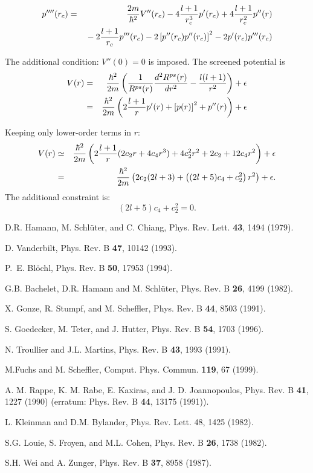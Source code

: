 \documentclass[12pt]{article}
\begin{document}
\begin{eqnarray}
p''''(r_c) & = & {2m\over\hbar^2}V''(r_c) - 4 {l+1\over r^3_c}p'(r_c)
                 + 4{l+1\over r^2_c}p''(r) \nonumber \\ & & \mbox{} 
            - 2{l+1\over r_c}p'''(r_c)
           - 2 \left[p''(r_c)p''(r_c)\right]^2 -2 p'(r_c)p'''(r_c)
\end{eqnarray}

The additional condition: $V''(0)=0$ is imposed. 
The screened potential is
\begin{eqnarray}
V(r)&=&{\hbar^2\over2m}\left({1\over R^{ps}(r)}{d^2R^{ps}(r)\over dr^2} 
     - {l(l+1)\over r^2}\right)+\epsilon \\
    &=&{\hbar^2\over2m}\left( 2{l+1\over r} p'(r)+\left[p(r)\right]^2+p''(r)
       \right)+\epsilon
\end{eqnarray}

Keeping only lower-order terms in $r$:
\begin{eqnarray}
V(r) &\simeq&{\hbar^2\over2m}\left( 2{l+1\over r} (2c_2r + 4c_4r^3) 
               + 4c_2^2r^2 + 2c_2 + 12c_4r^2\right) + \epsilon \\
     &   =  & {\hbar^2\over2m}\left( 2c_2(2l+3) + 
              \left((2l+5)c_4+c_2^2\right) r^2\right)+ \epsilon .
\end{eqnarray}
The additional constraint is:
\begin{equation}
(2l+5)c_4+c_2^2=0.
\end{equation}



\begin{thebibliography}{10}

D.R. Hamann, M. Schl\"uter, and C. Chiang, 
Phys. Rev. Lett. {\bf 43}, 1494 (1979).

 D. Vanderbilt, Phys. Rev. B  {\bf 47}, 10142 (1993).

 P.~E. Bl\"ochl, Phys. Rev. B {\bf 50}, 17953 (1994).

G.B. Bachelet, D.R. Hamann and M. Schl\"uter, Phys. Rev. B {\bf 26},
4199 (1982). 

X. Gonze, R. Stumpf, and M. Scheffler, Phys. Rev. B {\bf 44}, 8503 (1991).

S. Goedecker, M. Teter, and J. Hutter, Phys. Rev. B {\bf 54}, 1703 (1996).

 N. Troullier and J.L. Martins, Phys. Rev. B {\bf 43},
1993 (1991).

M.Fuchs and M. Scheffler, Comput. Phys. Commun. {\bf 119}, 67 (1999).

 A. M. Rappe, K. M. Rabe, E. Kaxiras, and J. D. Joannopoulos, 
Phys. Rev. B {\bf 41}, 1227 (1990) 
(erratum: Phys. Rev. B {\bf 44}, 13175 (1991)).

 L. Kleinman and D.M. Bylander, Phys. Rev. Lett. 48, 1425 (1982).

S.G. Louie, S. Froyen, and M.L. Cohen, Phys. Rev. B {\bf 26}, 1738 (1982).

 S.H. Wei and A. Zunger, Phys. Rev. B {\bf 37}, 8958 (1987).

\end{thebibliography}
\end{document}
